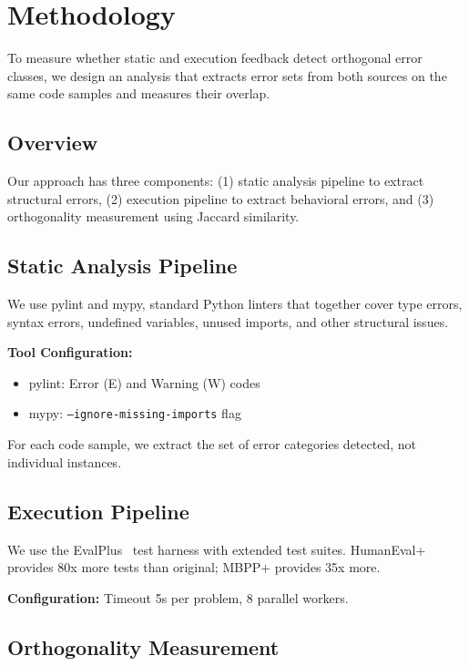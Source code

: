 \section{Methodology}
\label{sec:methodology}

To measure whether static and execution feedback detect orthogonal error classes, we design an analysis that extracts error sets from both sources on the same code samples and measures their overlap.

\subsection{Overview}

Our approach has three components: (1) static analysis pipeline to extract structural errors, (2) execution pipeline to extract behavioral errors, and (3) orthogonality measurement using Jaccard similarity.

\subsection{Static Analysis Pipeline}

We use pylint and mypy, standard Python linters that together cover type errors, syntax errors, undefined variables, unused imports, and other structural issues.

\textbf{Tool Configuration:}
\begin{itemize}
    \item pylint: Error (E) and Warning (W) codes
    \item mypy: \texttt{--ignore-missing-imports} flag
\end{itemize}

For each code sample, we extract the set of error categories detected, not individual instances.

\subsection{Execution Pipeline}

We use the EvalPlus~\cite{EvalPlus} test harness with extended test suites. HumanEval+ provides 80x more tests than original; MBPP+ provides 35x more.

\textbf{Configuration:} Timeout 5s per problem, 8 parallel workers.

\subsection{Orthogonality Measurement}

